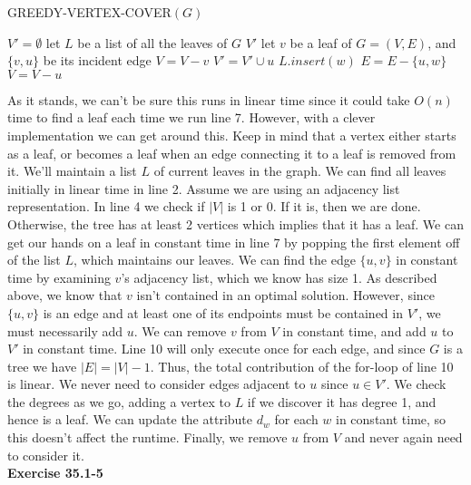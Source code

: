 \documentclass{article}
\begin{document}
\begin{algorithm}
\caption{GREEDY-VERTEX-COVER$(G)$}
\begin{algorithmic}[1]
\State $V' = \emptyset$
\State let $L$ be a list of all the leaves of $G$
		\State \Return $V'$
	\EndIf
	\State let $v$ be a leaf of $G = (V,E)$, and $\{v,u\}$ be its incident edge
	\State $V = V - v$
	\State $V' = V' \cup u$
			\State $L.insert(w)$
		\EndIf
		\State $E = E - \{u,w\}$
	\EndFor
	\State $V = V - u$
\EndWhile
\end{algorithmic}
\end{algorithm}

As it stands, we can't be sure this runs in linear time since it could take $O(n)$ time to find a leaf each time we run line 7.  However, with a clever implementation we can get around this.  Keep in mind that a vertex either starts as a leaf, or becomes a leaf when an edge connecting it to a leaf is removed from it.  We'll maintain a list $L$ of current leaves in the graph.  We can find all leaves initially in linear time in line 2.  Assume we are using an adjacency list representation.  In line 4 we check if $|V|$ is 1 or 0.  If it is, then we are done.  Otherwise, the tree has at least 2 vertices which implies that it has a leaf.  We can get our hands on a leaf in constant time in line 7 by popping the first element off of the list $L$, which maintains our leaves.  We can find the edge $\{u,v\}$ in constant time by examining $v$'s adjacency list, which we know has size 1.  As described above, we know that $v$ isn't contained in an optimal solution.  However, since $\{u,v\}$ is an edge and at least one of its endpoints must be contained in $V'$, we must necessarily add $u$.  We can remove $v$ from $V$ in constant time, and add $u$ to $V'$ in constant time.  Line 10 will only execute once for each edge, and since $G$ is a tree we have $|E| = |V| - 1$.  Thus, the total contribution of the for-loop of line 10 is linear.  We never need to consider edges adjacent to $u$ since $u \in V'$.  We check the degrees as we go, adding a vertex to $L$ if we discover it has degree 1, and hence is a leaf. We can update the attribute $d_w$ for each $w$ in constant time, so this doesn't affect the runtime.  Finally, we remove $u$ from $V$ and never again need to consider it.  \\


\noindent\textbf{Exercise 35.1-5}\\
\end{document}
